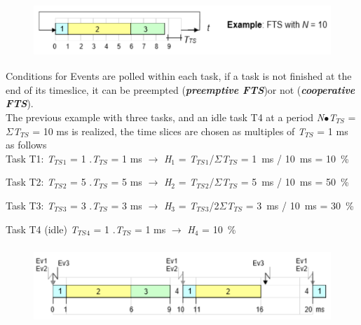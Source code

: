 	\begin{figure}[h]
    \centering
    \includegraphics[width=12cm, height=2cm]{Images/image92.png}
    \label{fig:Fig 37}
    \end{figure}

Conditions for Events are polled within each task, if a task is not finished at the end of its timeslice, it can be preempted (\textbf{\textit{preemptive FTS}})or not (\textbf{\textit{cooperative FTS}}).\\

The previous example with three tasks, and an idle task T4 at a period \textit{N}$\mathrm{\bullet}$\textit{T${}_{TS}$} = $\Sigma$\textit{T${}_{TS}$} = 10 ms is realized, the time slices are chosen as multiples of \textit{T${}_{TS}$} = 1 ms as follows \\

Task T1:    \textit{T${}_{TS}$}${}_{1}$ = 1 $.$\textit{T${}_{TS}$} = 1 ms $\rightarrow$ \textit{H}${}_{1}$ = \textit{T${}_{TS}$}${}_{1}$/$\Sigma$\textit{T${}_{TS}$} = 1~ms / 10~ms = 10~\%

Task T2:    \textit{T${}_{TS}$}${}_{2}$ = 5 $.$\textit{T${}_{TS}$} = 5 ms $\rightarrow$ \textit{H}${}_{2}$ = \textit{T${}_{TS}$}${}_{2}$/$\Sigma$\textit{T${}_{TS}$} = 5~ms / 10~ms = 50~\%

Task T3:     \textit{T${}_{TS}$}${}_{3}$ = 3 $.$\textit{T${}_{TS}$} = 3 ms $\rightarrow$ \textit{H}${}_{3}$ = \textit{T${}_{TS}$}${}_{3}$/2$\Sigma$\textit{T${}_{TS}$} = 3~ms / 10~ms = 30~\%

Task T4 (idle) \textit{T${}_{TS}$}${}_{4}$ = 1 $.$\textit{T${}_{TS}$} = 1 ms $\rightarrow$ \textit{H}${}_{4}$ = 10~\%

	\begin{figure}[h]
    \centering
    \includegraphics[width=13cm, height=3cm]{Images/image93.png}
    \label{fig:Fig 38}
    \end{figure}

